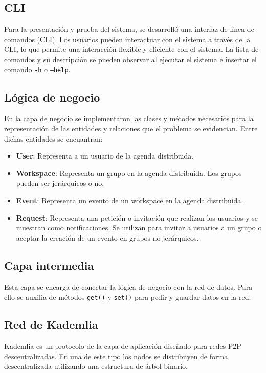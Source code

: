 \documentclass[10pt]{article} %
\begin{document}
	\subsection{CLI}
	
	Para la presentación y prueba del sistema, se desarrolló una interfaz de línea de comandos (CLI). Los usuarios pueden interactuar con el sistema a través de la CLI, lo que permite una interacción flexible y eficiente con el sistema. La lista de comandos y su descripci\'on se pueden observar al ejecutar el sistema e insertar el comando \texttt{-h} o \texttt{--help}.
	
	\subsection{L\'ogica de negocio}
	
	En la capa de negocio se implementaron las clases y m\'etodos necesarios para la representaci\'on de las entidades y relaciones que el problema se evidencian. Entre dichas entidades se encuantran:
	\begin{itemize}
		\item \textbf{User}: Representa a un usuario de la agenda distribuida.
		\item \textbf{Workspace}: Representa un grupo en la agenda distribuida. Los grupos pueden ser jer\'arquicos o no.
		\item \textbf{Event}: Representa un evento de un workspace en la agenda distribuida.
		\item \textbf{Request}: Representa una petici\'on o invitaci\'on que realizan los usuarios y se muestran como notificaciones. Se utilizan para invitar a usuarios a un grupo o aceptar la creaci\'on de un evento en grupos no jer\'arquicos.
	\end{itemize}

	
	\subsection{Capa intermedia}
	
	Esta capa se encarga de conectar la l\'ogica de negocio con la red de datos. Para ello se auxilia de m\'etodos \texttt{get()} y \texttt{set()} para pedir y guardar datos en la red.
	
	\subsection{Red de Kademlia}
	
	 Kademlia \cite{kad} es un protocolo de la capa de aplicación diseñado para redes P2P descentralizadas. En una de este tipo los nodos se distribuyen de forma descentralizada utilizando una estructura de árbol binario. 
	 
\end{document}
